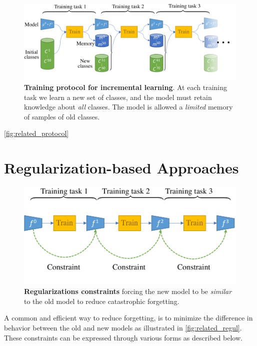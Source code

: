\begin{figure}[tb]
    \begin{center}
        \includegraphics[width=1.0\linewidth]{images/podnet/protocol}
    \end{center}
    \caption{\textbf{Training protocol for incremental learning}. At each training task we learn a
        new set of classes, and the model must retain knowledge about \textit{all} classes. The
        model is allowed a \textit{limited} memory of samples of old classes.}
    \label{fig:related_protocol}
\end{figure}

\autoref{fig:related_protocol}


\section{Regularization-based Approaches}

\begin{figure}[tb]
    \begin{center}
        \includegraphics[width=1.0\linewidth]{images/related/continual_regularizations.pdf}
    \end{center}
    \caption{\textbf{Regularizations constraints} forcing the new model to be \textit{similar} to
    the old model to reduce catastrophic forgetting.}
    \label{fig:related_regul}
\end{figure}

A common and efficient way to reduce forgetting, is to minimize the difference in behavior between
the old and new models as illustrated in \autoref{fig:related_regul}. These constraints can be
expressed through various forms as described below.

